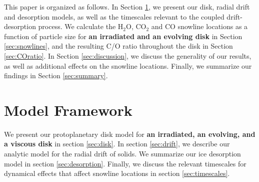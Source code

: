\documentclass[apj]{emulateapj}
\newcommand{\emgr}[1]{\emph{ \color{gray} #1}}
\begin{document}



This paper is organized as follows. In Section \ref{sec:model}, we present our disk, radial drift and desorption models, as well as the timescales relevant to the coupled drift-desorption process. We calculate the H$_2$O, CO$_2$ and CO snowline locations as a function of particle size for \textbf{an irradiated and an evolving disk} in Section \ref{sec:snowlines}, and the resulting C/O ratio throughout the disk in Section \ref{sec:COratio}. In Section \ref{sec:discussion}, we discuss the generality of our results, as well as additional effects on the snowline locations. Finally, we summarize our findings in Section \ref{sec:summary}.

\section{Model Framework} 
\label{sec:model}

We present our protoplanetary disk model for \textbf{an irradiated, an evolving, and a viscous disk} in section \ref{sec:disk}. In section \ref{sec:drift}, we describe our analytic model for the radial drift of solids. We summarize our ice desorption model in section \ref{sec:desorption}. Finally, we discuss the relevant timescales for dynamical effects that affect snowline locations %
in section \ref{sec:timescales}.
\end{document}
